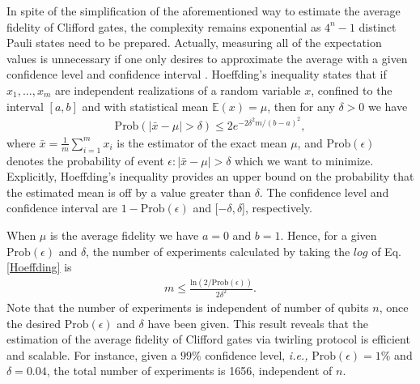 \documentclass[prl,twocolumn,showpacs,superscriptaddress]{revtex4-1}
\begin{document}
In spite of the simplification of the aforementioned way to estimate the average fidelity of Clifford gates, the complexity remains exponential as $4^n-1$ distinct Pauli states need to be prepared. Actually, measuring all of the expectation values is unnecessary if one only desires to approximate the average with a given confidence level and confidence interval \cite{Emerson2007}.  Hoeffding's inequality \cite{Venkatesh2012} states that if $x_1, . . . ,x_m$ are independent realizations of a random variable $x$, confined to the interval $[a, b]$ and with statistical mean $\mathbb{E}(x) = \mu$, then for any $\delta >0$ we have
\begin{align} \label{Hoeffding}
\text{Prob} \left( |\bar{x}-\mu| > \delta \right) \leq 2e^{-2\delta^2m/(b-a)^2},
\end{align}
where $\bar{x} = \frac{1}{m}\sum_{i=1}^m x_i$ is the estimator of the exact mean $\mu$, and $\text{Prob}(\epsilon)$ denotes the probability of event $\epsilon: |\bar{x}-\mu| > \delta$ which we want to minimize. Explicitly,  Hoeffding's inequality provides an upper bound on the probability that the estimated mean is off by a value greater than $\delta$. The confidence level and confidence interval are  $1-\text{Prob}(\epsilon)$ and [$-\delta, \delta$], respectively.

{When $\mu$ is the  average fidelity we have  $a=0$ and $b=1$.} Hence, for a given $\text{Prob}(\epsilon)$ and $\delta$, the number of experiments {calculated  by taking the $log$  of Eq. \eqref{Hoeffding} is}
\begin{align} \label{exp_number}
m\leq \frac{\text{ln}(2/\text{Prob}(\epsilon))}{2\delta^2}.
\end{align}
 Note that the number of experiments is independent of number of qubits  $n$, once the desired $\text{Prob}(\epsilon)$ and $\delta$ have been given. This result reveals that the estimation of the average fidelity of Clifford gates via twirling protocol is efficient and scalable. For instance, given a $99\%$ confidence level, \emph{i.e.,} $\text{Prob}(\epsilon)=1\%$ and $\delta = 0.04$, the total number of experiments is 1656, {independent of $n$}.
\end{document}

